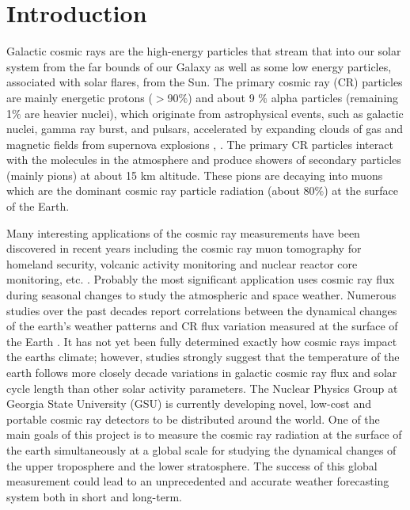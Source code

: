 \section{Introduction}

\label{intro}
Galactic cosmic rays are the high-energy particles that stream that into our solar system from the far bounds of our Galaxy as well as some low energy particles, associated with solar flares, from the Sun. 
The primary cosmic ray (CR) particles are mainly energetic protons ($>$90$\%$) and about 9 $\%$ alpha particles (remaining 1$\%$ are heavier nuclei), which originate from astrophysical events, such as galactic nuclei, gamma ray burst, and pulsars, accelerated by expanding clouds of gas and magnetic fields from supernova explosions \cite{Supernova_cosmic}, \cite{pdg:cosmic,dorman:crv}. The primary CR particles interact with the molecules in the atmosphere and produce showers of secondary particles (mainly pions) at about 15 km altitude. These pions are decaying into muons which are the dominant cosmic ray particle radiation (about 80$\%$) at the surface of the Earth.  

Many interesting applications of the cosmic ray measurements have been discovered in recent years including the cosmic ray muon tomography for homeland security, volcanic activity monitoring and nuclear reactor core monitoring, etc. \cite{Pyramid_muon,Muon_tomography}. 
Probably the most significant application uses cosmic ray flux during seasonal changes to study the atmospheric and space weather. \cite{np6:phys} Numerous studies over the past decades report correlations between the dynamical changes of the earth's weather patterns and CR flux variation measured at the surface of the Earth \cite{kirkby:climate,lu:correlation,ollila:changes,shaviv:climate}. It has not yet been fully determined exactly how cosmic rays impact the earths climate; however, studies strongly suggest that the temperature of the earth follows more closely decade variations in galactic cosmic ray flux and solar cycle length than other solar activity parameters. \cite{svensmark:influence} 
The Nuclear Physics Group at Georgia State University (GSU) \cite{np6:phys} is currently developing novel, low-cost and portable cosmic ray detectors to be distributed around the world. One of the main goals of this project is to measure the cosmic ray radiation at the surface of the earth simultaneously at a global scale for studying the dynamical changes of the upper troposphere and the lower stratosphere. The success of this global measurement could lead to an unprecedented and accurate weather forecasting system both in short and long-term. 

